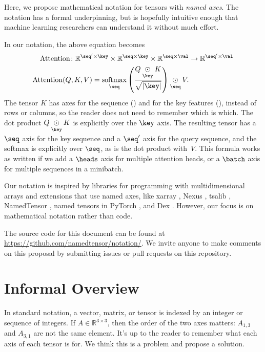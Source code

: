 \documentclass{article}
\newcommand{\reals}{\mathbb{R}}
\begin{document}
Here, we propose mathematical notation for tensors with \emph{named axes}. The notation has a formal underpinning, but is hopefully intuitive enough that machine learning researchers can understand it without much effort.

In our notation, the above equation becomes
\begin{align*}
  \text{Attention} \colon \mathbb{R}^{\seq' \times \key} \times \mathbb{R}^{\seq \times \key} \times \mathbb{R}^{\seq \times\val} &\rightarrow \mathbb{R}^{\seq' \times \val} \\
  \text{Attention}(Q,K,V) = \nfun{\seq}{softmax} \left( \frac{Q \ndot{\key} K}{\sqrt{|\key|}} \right) \ndot{\seq} V.
\end{align*}
The tensor $K$ has axes for the sequence (\seq) and for the key features (\key), instead of rows or columns, so the reader does not need to remember which is which. The dot product $Q \ndot{\key} K$ is explicitly over the $\key$ axis. The resulting tensor has a $\seq$ axis for the key sequence and a $\seq'$ axis for the query sequence, and the softmax is explicitly over $\seq$, as is the dot product with~$V$.
This formula works as written if we add a $\heads$ axis for multiple attention heads, or a $\batch$ axis for multiple sequences in a minibatch.

Our notation is inspired by libraries for programming with multidimensional arrays \citep{numpy,pytorch} and extensions that use named axes, like xarray \citep{xarray}, Nexus \citep{chen2017typesafe}, tsalib \citep{tsalib}, NamedTensor \citep{namedtensor}, named tensors in PyTorch \citep{named-tensors}, and Dex \citep{maclaurin+:2019}. However, our focus is on mathematical notation rather than code.

The source code for this document can be found at \url{https://github.com/namedtensor/notation/}. We invite anyone to make comments on this proposal by submitting issues or pull requests on this repository.

\section{Informal Overview}
\label{sec:overview}

In standard notation, a vector, matrix, or tensor is indexed by an integer or sequence of integers. If $A \in \reals^{3\times3}$, then the order of the two axes matters: $A_{1,3}$ and $A_{3,1}$ are not the same element. It's up to the reader to remember what each axis of each tensor is for. We think this is a problem and propose a solution.
\end{document}
